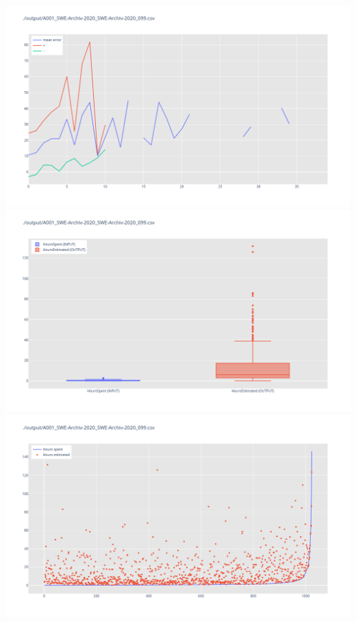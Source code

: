 \includegraphics[width=\textwidth]{Scripts/output/A001_SWE-Archiv-2020_SWE-Archiv-2020_099.csv.error_distribution.png}
\includegraphics[width=\textwidth]{Scripts/output/A001_SWE-Archiv-2020_SWE-Archiv-2020_099.csv.png}
\includegraphics[width=\textwidth]{Scripts/output/A001_SWE-Archiv-2020_SWE-Archiv-2020_099.csv.scatter.png}
